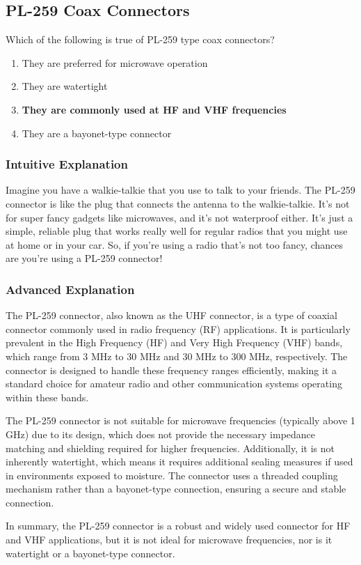 \subsection{PL-259 Coax Connectors}
\label{T9B07}

\begin{tcolorbox}[colback=gray!10!white,colframe=black!75!black,title=T9B07]
Which of the following is true of PL-259 type coax connectors?
\begin{enumerate}[label=\Alph*)]
    \item They are preferred for microwave operation
    \item They are watertight
    \item \textbf{They are commonly used at HF and VHF frequencies}
    \item They are a bayonet-type connector
\end{enumerate}
\end{tcolorbox}

\subsubsection{Intuitive Explanation}
Imagine you have a walkie-talkie that you use to talk to your friends. The PL-259 connector is like the plug that connects the antenna to the walkie-talkie. It’s not for super fancy gadgets like microwaves, and it’s not waterproof either. It’s just a simple, reliable plug that works really well for regular radios that you might use at home or in your car. So, if you’re using a radio that’s not too fancy, chances are you’re using a PL-259 connector!

\subsubsection{Advanced Explanation}
The PL-259 connector, also known as the UHF connector, is a type of coaxial connector commonly used in radio frequency (RF) applications. It is particularly prevalent in the High Frequency (HF) and Very High Frequency (VHF) bands, which range from 3 MHz to 30 MHz and 30 MHz to 300 MHz, respectively. The connector is designed to handle these frequency ranges efficiently, making it a standard choice for amateur radio and other communication systems operating within these bands.

The PL-259 connector is not suitable for microwave frequencies (typically above 1 GHz) due to its design, which does not provide the necessary impedance matching and shielding required for higher frequencies. Additionally, it is not inherently watertight, which means it requires additional sealing measures if used in environments exposed to moisture. The connector uses a threaded coupling mechanism rather than a bayonet-type connection, ensuring a secure and stable connection.

In summary, the PL-259 connector is a robust and widely used connector for HF and VHF applications, but it is not ideal for microwave frequencies, nor is it watertight or a bayonet-type connector.

